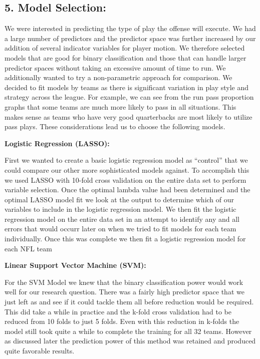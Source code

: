 \documentclass[
]{article}
\begin{document}
\subsection{5. Model Selection:}\label{model-selection}

We were interested in predicting the type of play the offense will
execute. We had a large number of predictors and the predictor space was
further increased by our addition of several indicator variables for
player motion. We therefore selected models that are good for binary
classification and those that can handle larger predictor spaces without
taking an excessive amount of time to run. We additionally wanted to try
a non-parametric approach for comparison. We decided to fit models by
teams as there is significant variation in play style and strategy
across the league. For example, we can see from the run pass proportion
graphs that some teams are much more likely to pass in all situations.
This makes sense as teams who have very good quarterbacks are most
likely to utilize pass plays. These considerations lead us to choose the
following models.

\textbf{Logistic Regression (LASSO):}

First we wanted to create a basic logistic regression model as
``control'' that we could compare our other more sophisticated models
against. To accomplish this we used LASSO with 10-fold cross validation
on the entire data set to perform variable selection. Once the optimal
lambda value had been determined and the optimal LASSO model fit we look
at the output to determine which of our variables to include in the
logistic regression model. We then fit the logistic regression model on
the entire data set in an attempt to identify any and all errors that
would occurr later on when we tried to fit models for each team
individually. Once this was complete we then fit a logistic regression
model for each NFL team

\textbf{Linear Support Vector Machine (SVM):}

For the SVM Model we knew that the binary classification power would
work well for our research question. There was a fairly high predictor
space that we just left as and see if it could tackle them all before
reduction would be required. This did take a while in practice and the
k-fold cross validation had to be reduced from 10 folds to just 5 folds.
Even with this reduction in k-folds the model still took quite a while
to complete the training for all 32 teams. However as discussed later
the prediction power of this method was retained and produced quite
favorable results.
\end{document}
